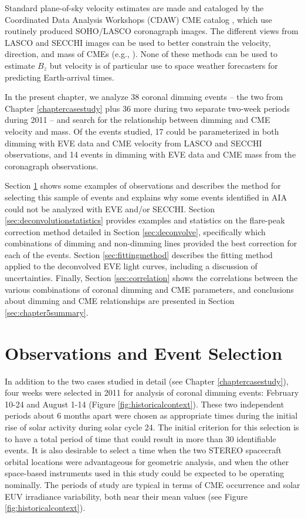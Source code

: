 Standard plane-of-sky velocity estimates are made and cataloged by the Coordinated Data Analysis Workshops (CDAW) CME catalog \citep{Gopalswamy2009}, which use routinely produced SOHO/LASCO coronagraph images. The different views from LASCO and SECCHI images can be used to better constrain the velocity, direction, and mass of CMEs (e.g., \citealt{Colaninno2009}). None of these methods can be used to estimate $B_z$ but velocity is of particular use to space weather forecasters for predicting Earth-arrival times.

In the present chapter, we analyze 38 coronal dimming events -- the two from Chapter \ref{chaptercasestudy} plus 36 more during two separate two-week periods during 2011 -- and search for the relationship between dimming and CME velocity and mass. Of the events studied, 17 could be parameterized in both dimming with EVE data and CME velocity from LASCO and SECCHI observations, and 14 events in dimming with EVE data and CME mass from the coronagraph observations. 

Section \ref{sec:eventselection} shows some examples of observations and describes the method for selecting this sample of events and explains why some events identified in AIA could not be analyzed with EVE and/or SECCHI. Section \ref{sec:deconvolutionstatistics} provides examples and statistics on the flare-peak correction method detailed in Section \ref{sec:deconvolve}, specifically which combinations of dimming and non-dimming lines provided the best correction for each of the events. Section \ref{sec:fittingmethod} describes the fitting method applied to the deconvolved EVE light curves, including a discussion of uncertainties. Finally, Section \ref{sec:correlation} shows the correlations between the various combinations of coronal dimming and CME parameters, and conclusions about dimming and CME relationships are presented in Section \ref{sec:chapter5summary}.

\section{Observations and Event Selection}
\label{sec:eventselection}
In addition to the two cases studied in detail (see Chapter \ref{chaptercasestudy}), four weeks were selected in 2011 for analysis of coronal dimming events: February 10-24 and August 1-14 (Figure \ref{fig:historicalcontext}). These two independent periods about 6 months apart were chosen as appropriate times during the initial rise of solar activity during solar cycle 24. The initial criterion for this selection is to have a total period of time that could result in more than 30 identifiable events. It is also desirable to select a time when the two STEREO spacecraft orbital locations were advantageous for geometric analysis, and when the other space-based instruments used in this study could be expected to be operating nominally. The periods of study are typical in terms of CME occurrence and solar EUV irradiance variability, both near their mean values (see Figure \ref{fig:historicalcontext}).
 
